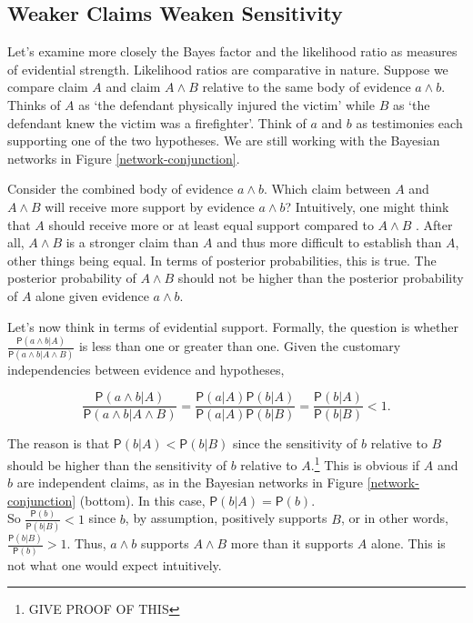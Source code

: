 \documentclass[10pt,dvipsnames,enabledeprecatedfontcommands]{scrartcl}
\newcommand{\pr}[1]{\mathsf{P}(#1)}
\begin{document}
\subsection{Weaker Claims Weaken
Sensitivity}\label{weaker-claims-weaken-sensitivity}

Let's examine more closely the Bayes factor and the likelihood ratio as
measures of evidential strength. Likelihood ratios are comparative in
nature. Suppose we compare claim \(A\) and claim \(A\wedge B\) relative
to the same body of evidence \(a\wedge b\). Thinks of \(A\) as `the
defendant physically injured the victim' while \(B\) as `the defendant
knew the victim was a firefighter'. Think of \(a\) and \(b\) as
testimonies each supporting one of the two hypotheses. We are still
working with the Bayesian networks in Figure \ref{network-conjunction}.

Consider the combined body of evidence \(a\wedge b\). Which claim
between \(A\) and \(A\wedge B\) will receive more support by evidence
\(a\wedge b\)? Intuitively, one might think that \(A\) should receive
more or at least equal support compared to \(A\wedge B\) . After all,
\(A\wedge B\) is a stronger claim than \(A\) and thus more difficult to
establish than \(A\), other things being equal. In terms of posterior
probabilities, this is true. The posterior probability of \(A\wedge B\)
should not be higher than the posterior probability of \(A\) alone given
evidence \(a \wedge b\).

Let's now think in terms of evidential support. Formally, the question
is whether
\(\frac{\pr{a\wedge b \vert A}}{\pr{a\wedge b \vert A \wedge B}}\) is
less than one or greater than one. Given the customary independencies
between evidence and hypotheses,

\[\frac{\pr{a\wedge b \vert A}}{\pr{a\wedge b \vert A \wedge B}}=\frac{\pr{a \vert A} \pr{b \vert A}}{\pr{a \vert A} \pr{b \vert B}}=\frac{\pr{b \vert A}}{\pr{b \vert B}}<1.\]

\noindent
The reason is that \(\pr{b \vert A} < \pr{b \vert B}\) since the
sensitivity of \(b\) relative to \(B\) should be higher than the
sensitivity of \(b\) relative to \(A\).\footnote{GIVE PROOF OF THIS}
This is obvious if \(A\) and \(b\) are independent claims, as in the
Bayesian networks in Figure \ref{network-conjunction} (bottom). In this
case, \(\pr{b \vert A}=\pr{b}\).\\
So \(\frac{\pr{b}}{\pr{b \vert B}}<1\) since \(b\), by assumption,
positively supports \(B\), or in other words,
\(\frac{\pr{b \vert B}}{\pr{b}}>1\). Thus, \(a\wedge b\) supports
\(A\wedge B\) more than it supports \(A\) alone. This is not what one
would expect intuitively.
\end{document}
